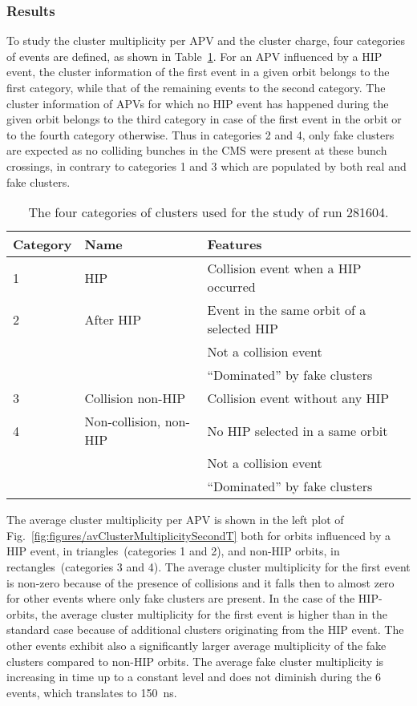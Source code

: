 \subsubsection{Results}

To study the cluster multiplicity per APV and the cluster charge, four categories of events are defined, as shown in Table~\ref{tab:eventCategories}. For an APV influenced by a HIP event, the cluster information of the first event in a given orbit belongs to the first category, while that of the remaining events to the second category. The cluster information of APVs for which no HIP event has happened during the given orbit belongs to the third category in case of the first event in the orbit or to the fourth category otherwise. Thus in categories 2 and 4, only fake clusters are expected as no colliding bunches in the CMS were present at these bunch crossings, in contrary to categories 1 and 3 which are populated by both real and fake clusters.


\begin{table}[h]
\begin{center}
\begin{tabular}{|l|l|l|}
\hline
Category & Name  & Features \\
\hline
1 & HIP & Collision event when a HIP occurred \\
\hline
2 & After HIP & Event in the same orbit of a selected HIP \\
& & Not a collision event \\
& & ``Dominated'' by fake clusters \\
\hline
3 & Collision non-HIP & Collision event without any HIP \\
\hline
4 & Non-collision, non-HIP  & No HIP selected in a same orbit \\
& & Not a collision event \\
& & ``Dominated'' by fake clusters \\
\hline
\end{tabular}
\caption[Table caption text]{The four categories of clusters used for the study of run 281604. }
\label{tab:eventCategories}
\end{center}
\end{table}

The average cluster multiplicity per APV is shown in the left plot of Fig.~\ref{fig:figures/avClusterMultiplicitySecondT} both for orbits influenced by a HIP event, in triangles~(categories 1 and 2), and non-HIP orbits, in rectangles~(categories 3 and 4). The average cluster multiplicity for the first event is non-zero because of the presence of collisions and it falls then to almost zero for other events where only fake clusters are present. In the case of the HIP-orbits, the average cluster multiplicity for the first event is higher than in the standard case because of additional clusters originating from the HIP event. The other events exhibit also a significantly larger average multiplicity of the fake clusters compared to non-HIP orbits. The average fake cluster multiplicity is increasing in time up to a constant level and does not diminish during the 6 events, which translates to 150~ns. 


